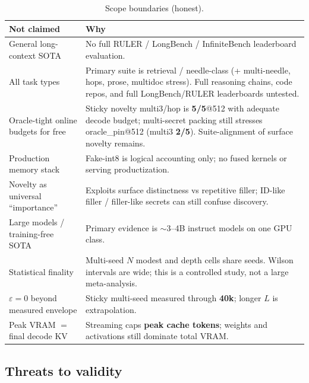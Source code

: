 \documentclass[11pt,a4paper]{article}
\begin{document}
\begin{table}[!htbp]
\centering
\caption{Scope boundaries (honest).}
\label{tab:noclaim}
\small
\begin{tabular}{@{}p{}p{}@{}}
\toprule
\textbf{Not claimed} & \textbf{Why} \\
\midrule
General long-context SOTA &
  No full RULER / LongBench / InfiniteBench leaderboard evaluation. \\
All task types &
  Primary suite is retrieval / needle-class (+ multi-needle, hops, prose, multidoc stress). Full reasoning chains, code repos, and full LongBench/RULER leaderboards untested. \\
Oracle-tight online budgets for free &
  Sticky novelty multi3/hop is \textbf{5/5}@512 with adequate decode budget; multi-secret packing still stresses oracle\_pin@512 (multi3 \textbf{2/5}). Suite-alignment of surface novelty remains. \\
Production memory stack &
  Fake-int8 is logical accounting only; no fused kernels or serving productization. \\
Novelty as universal ``importance'' &
  Exploits surface distinctness vs repetitive filler; ID-like filler / filler-like secrets can still confuse discovery. \\
Large models / training-free SOTA &
  Primary evidence is $\sim$3--4B instruct models on one GPU class. \\
Statistical finality &
  Multi-seed $N$ modest and depth cells share seeds. Wilson intervals are wide; this is a controlled study, not a large meta-analysis. \\
$\varepsilon\!=\!0$ beyond measured envelope &
  Sticky multi-seed measured through \textbf{40k}; longer $L$ is extrapolation. \\
Peak VRAM $=$ final decode KV &
  Streaming caps \textbf{peak cache tokens}; weights and activations still dominate total VRAM. \\
\bottomrule
\end{tabular}
\end{table}

\subsection{Threats to validity}
\end{document}
